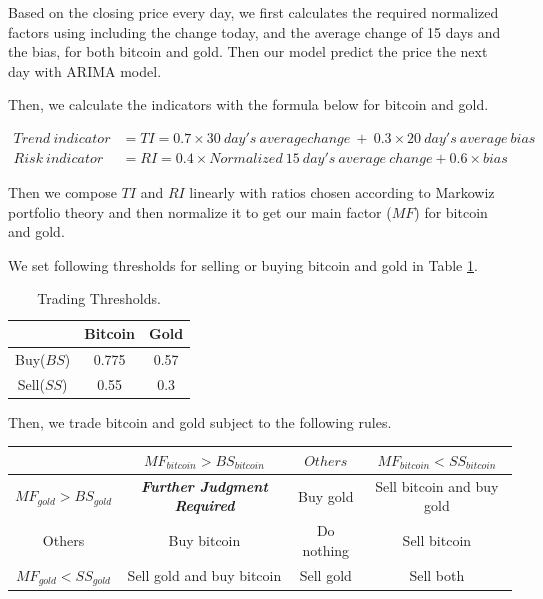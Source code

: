 \documentclass[12pt,a4paper]{article}
\begin{document}
\begin{spacing}{1.2}
Based on the closing price every day, we first calculates the required normalized factors using including the change today, and the average change of 15 days and the bias, for both bitcoin and gold. Then our model predict the price the next day with ARIMA model.

Then, we calculate the indicators with the formula below for bitcoin and gold. 


\begin{align*}
	Trend \ indicator &= TI = 0.7 \times 30 \ day's \ average change \ + \ 0.3 \times 20 \ day's \ average \ bias \\
	Risk \ indicator &= RI = 0.4 \times Normalized \ 15 \ day's \ average \ change + 0.6 \times bias
\end{align*}

Then we compose $TI$ and $RI$ linearly with ratios chosen according to Markowiz portfolio theory and then normalize it to get our main factor ($MF$) for bitcoin and gold. 

We set following thresholds for selling or buying bitcoin and gold in Table \ref{table:threshold}.

\begin{table}[H]
	\renewcommand{\arraystretch}{1.5}
	\caption{Trading Thresholds.}
	\label{table:threshold}
	\begin{center}
		{\footnotesize
			\begin{tabular}{c c c}
				\toprule
				{ } & {Bitcoin} & {Gold} \\
				\midrule
				Buy($BS$) & 0.775 & 0.57 \\
				Sell($SS$) & 0.55 & 0.3 \\
				\bottomrule
		\end{tabular}}
	\end{center}	
\end{table}

Then, we trade bitcoin and gold subject to the following rules.

\begin{center}
	\begin{tabular}{ |c|c|c|c| } 
		\hline
		& $MF_{bitcoin} > BS_{bitcoin}$ & $Others$ & $MF_{bitcoin} < SS_{bitcoin}$ \\ 
		\hline
		$MF_{gold} > BS_{gold}$ & \textbf{\textit{Further Judgment Required}}  & Buy gold & Sell bitcoin and buy gold  \\ 
		\hline
		Others & Buy bitcoin & Do nothing & Sell bitcoin \\
		\hline
		$MF_{gold} < SS_{gold}$ & Sell gold and buy bitcoin & Sell gold & Sell both \\ 
		\hline
	\end{tabular}
\end{center}


\end{spacing}
\end{document}
